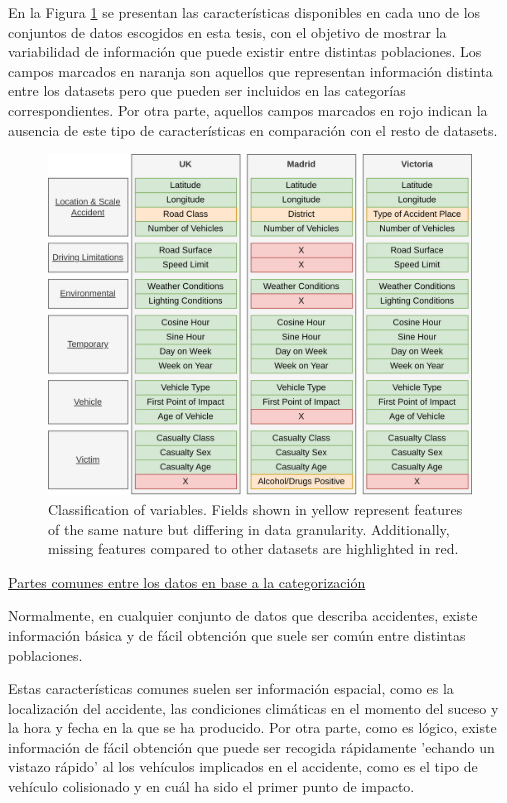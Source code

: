 \documentclass{uathesis-es}
\begin{document}
{	En la Figura \ref{FeaturesClassification} se presentan las características disponibles en cada uno de los conjuntos de datos escogidos en esta tesis, con el objetivo de mostrar la variabilidad de información que puede existir entre distintas poblaciones. Los campos marcados en naranja son aquellos que representan información distinta entre los datasets pero que pueden ser incluidos en las categorías correspondientes. Por otra parte, aquellos campos marcados en rojo indican la ausencia de este tipo de características en comparación con el resto de datasets.
	
	\begin{figure}[H]
		\centering
		\includegraphics[width=14cm]{Figures/Dataset Comparative.png}
		\caption{Classification of variables. Fields shown in yellow represent features of the same nature but differing in data granularity. Additionally, missing features compared to other datasets are highlighted in red.}
		\label{FeaturesClassification}
	\end{figure}
	
	\underline{Partes comunes entre los datos en base a la categorización}
	
	Normalmente, en cualquier conjunto de datos que describa accidentes, existe información básica y de fácil obtención que suele ser común entre distintas poblaciones.
	
	Estas características comunes suelen ser información espacial, como es la localización del accidente, las condiciones climáticas en el momento del suceso y la hora y fecha en la que se ha producido. Por otra parte, como es lógico, existe información de fácil obtención que puede ser recogida rápidamente 'echando un vistazo rápido' al los vehículos implicados en el accidente, como es el tipo de vehículo colisionado y en cuál ha sido el primer punto de impacto.
	
}
\end{document}
